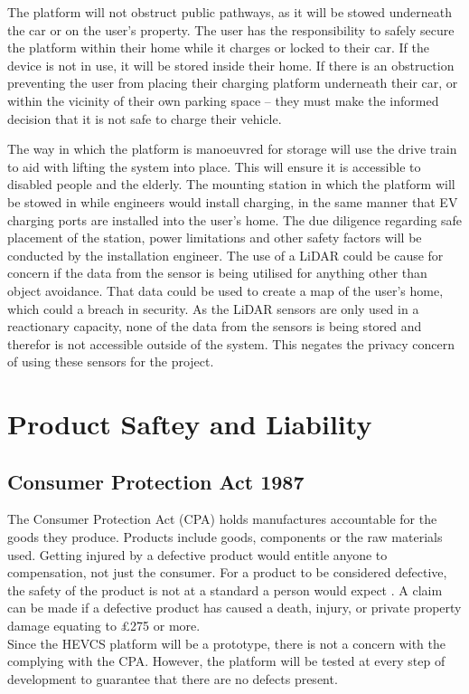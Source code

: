 \documentclass [12pt]{article}
\begin{document}
The platform will not obstruct public pathways, as it will be stowed underneath the car or on the user’s property. The user has the responsibility to safely secure the platform within their home while it charges or locked to their car. If the device is not in use, it will be stored inside their home. If there is an obstruction preventing the user from placing their charging platform underneath their car, or within the vicinity of their own parking space – they must make the informed decision that it is not safe to charge their vehicle.

The way in which the platform is manoeuvred for storage will use the drive train to aid with lifting the system into place. This will ensure it is accessible to disabled people and the elderly. The mounting station in which the platform will be stowed in while engineers would install charging, in the same manner that EV charging ports are installed into the user’s home. The due diligence regarding safe placement of the station, power limitations and other safety factors will be conducted by the installation engineer.
The use of a LiDAR could be cause for concern if the data from the sensor is being utilised for anything other than object avoidance. That data could be used to create a map of the user’s home, which could a breach in security. As the LiDAR sensors are only used in a reactionary capacity, none of the data from the sensors is being stored and therefor is not accessible outside of the system. This negates the privacy concern of using these sensors for the project.

\section{Product Saftey and Liability}\label{sec:Product_Safety_and_Liability}

\subsection{Consumer Protection Act 1987}\label{sec:Consumer_Protection_Act}

The Consumer Protection Act (CPA) holds manufactures accountable for the goods they produce. Products include goods, components or the raw materials used. Getting injured by a defective product would entitle anyone to compensation, not just the consumer. For a product to be considered defective, the safety of the product is not at a standard a person would expect \cite{Consumer_Protection}. A claim can be made if a defective product has caused a death, injury, or private property damage equating to £275 or more.
\\
Since the HEVCS platform will be a prototype, there is not a concern with the complying with the CPA. However, the platform will be tested at every step of development to guarantee that there are no defects present.
\end{document}
